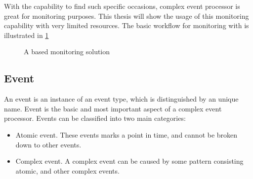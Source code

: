 With the capability to find such specific occasions, complex event processor is great for monitoring purposes. This thesis will show the usage of this monitoring capability with very limited resources. The basic workflow for monitoring with \cep is illustrated in \cref{fig:cep_monitoring}

\begin{figure}[!h]
	\centering
	\caption{A \cep based monitoring solution}
	\label{fig:cep_monitoring}
\end{figure}

\subsection{Event}

An event is an instance of an event type, which is distinguished by an unique name.
Event is the basic and most important aspect of a complex event processor. Events can be classified into two main categories:
\begin{itemize}
	\item Atomic event. These events marks a point in time, and cannot be broken down to other events.
	\item Complex event. A complex event can be caused by some pattern consisting atomic, and other complex events.
\end{itemize}

\needspace{10em}
